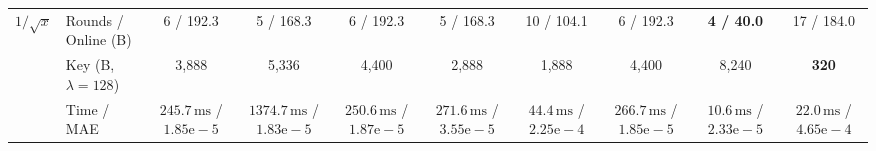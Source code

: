 \begin{tabular}{@{}llcccccccc@{}}
\midrule
\multirow{3}{*}{$1/\sqrt{x}$}
 & Rounds / Online (B) & 6 / 192.3 & 5 / 168.3 & 6 / 192.3 & 5 / 168.3 & 10 / 104.1 & 6 / 192.3 & \textbf{4 / 40.0} & 17 / 184.0 \\
 & Key (B, $\lambda{=}128$) & 3,888 & 5,336 & 4,400 & 2,888 & 1,888 & 4,400 & 8,240 & \textbf{320} \\
 & Time / MAE & $245.7\,\text{ms}$ / $1.85\text{e}-5$ & $1374.7\,\text{ms}$ / $1.83\text{e}-5$ & $250.6\,\text{ms}$ / $1.87\text{e}-5$ & $271.6\,\text{ms}$ / $3.55\text{e}-5$ & $44.4\,\text{ms}$ / $2.25\text{e}-4$ & $266.7\,\text{ms}$ / $1.85\text{e}-5$ & $10.6\,\text{ms}$ / $2.33\text{e}-5$ & $22.0\,\text{ms}$ / $4.65\text{e}-4$ \\
\bottomrule
\end{tabular}
